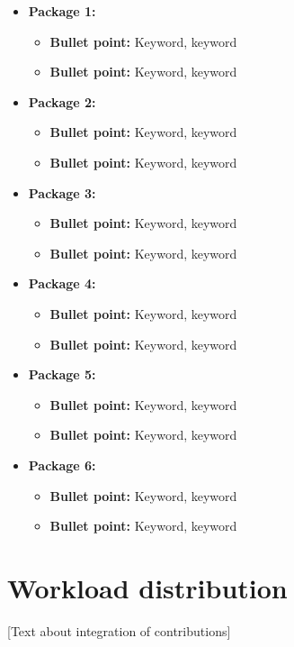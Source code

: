 \documentclass[lang=english,inputenc=utf8,fontsize=10pt]{ldvarticle}
\begin{document}
\begin{itemize}
	\item \textbf{Package 1:}
		\begin{itemize}
			\item \textbf{Bullet point:} Keyword, keyword
			\item \textbf{Bullet point:} Keyword, keyword
		\end{itemize}
	\item \textbf{Package 2:}
		\begin{itemize}
			\item \textbf{Bullet point:} Keyword, keyword
			\item \textbf{Bullet point:} Keyword, keyword
		\end{itemize}
	\item \textbf{Package 3:}
		\begin{itemize}
			\item \textbf{Bullet point:} Keyword, keyword
			\item \textbf{Bullet point:} Keyword, keyword
		\end{itemize}
	\item \textbf{Package 4:}
		\begin{itemize}
			\item \textbf{Bullet point:} Keyword, keyword
			\item \textbf{Bullet point:} Keyword, keyword
		\end{itemize}
	\item \textbf{Package 5:}
		\begin{itemize}
			\item \textbf{Bullet point:} Keyword, keyword
			\item \textbf{Bullet point:} Keyword, keyword
		\end{itemize}
	\item \textbf{Package 6:}
		\begin{itemize}
			\item \textbf{Bullet point:} Keyword, keyword
			\item \textbf{Bullet point:} Keyword, keyword
		\end{itemize}
\end{itemize}

\newpage

\section{Workload distribution}

[Text about integration of contributions] \lipsum[2-3]
\end{document}
